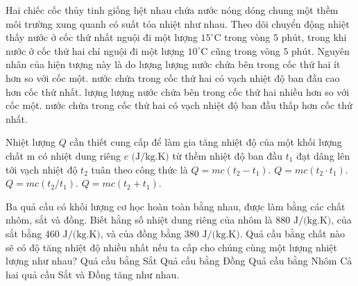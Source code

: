\begin{ex}%
	Hai chiếc cốc thủy tinh giống hệt nhau chứa nước nóng dóng chung một thềm môi trường xung quanh có suất tỏa nhiệt như nhau. Theo dõi chuyển động nhiệt thấy nước ở cốc thứ nhất nguội đi một lượng $15^\circ\text{C}$ trong vòng $5\text{ phút}$, trong khi nước ở cốc thứ hai chỉ nguội đi một lượng $10^\circ\text{C}$ cũng trong vòng $5\text{ phút}$. Nguyên nhân của hiện tượng này là do
	\choice
	{lượng lượng nước chứa bên trong cốc thứ hai ít hơn so với cốc một.}
	{nước chứa trong cốc thứ hai có vạch nhiệt độ ban đầu cao hơn cốc thứ nhất.}
	{lượng lượng nước chứa bên trong cốc thứ hai nhiều hơn so với cốc một.}
	{\True nước chứa trong cốc thứ hai có vạch nhiệt độ ban đầu thấp hơn cốc thứ nhất.}
\end{ex}

\begin{ex}%
	Nhiệt lượng $Q$ cần thiết cung cấp để làm gia tăng nhiệt độ của một khối lượng chất m có nhiệt dung riêng $c\text{ (J/kg.K)}$ từ thềm nhiệt độ ban đầu $t_1$ đạt dâng lên tới vạch nhiệt độ $t_2$ tuân theo công thức là
	\choice
	{\True $Q=mc(t_2-t_1)$.}
	{$Q=mc(t_2 \cdot t_1)$.}
	{$Q=mc(t_2/t_1)$.}
	{$Q=mc(t_2+t_1)$.}
\end{ex}

\begin{ex}%
	Ba quả cầu có khối lượng cơ học hoàn toàn bằng nhau, được làm bằng các chất nhôm, sắt và đồng. Biết hằng số nhiệt dung riêng của nhôm là $880\text{ J/(kg.K)}$, của sắt bằng $460\text{ J/(kg.K)}$, và của đồng bằng $380\text{ J/(kg.K)}$. Quả cầu bằng chất nào sẽ có độ tăng nhiệt độ nhiều nhất nếu ta cấp cho chúng cùng một lượng nhiệt lượng như nhau?
	\choice
	{Quả cầu bằng Sắt}
	{\True Quả cầu bằng Đồng}
	{Quả cầu bằng Nhôm}
	{Cả hai quả cầu Sắt và Đồng tăng như nhau.}
\end{ex}

